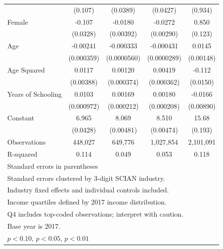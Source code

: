 \begin{table}[htbp]
\begin{tabular}{l*{4}{c}}
                    &     (0.107)         &    (0.0389)         &    (0.0427)         &     (0.934)         \\
\addlinespace
Female              &      -0.107\sym{***}&     -0.0180\sym{***}&     -0.0272\sym{***}&       0.850\sym{***}\\
                    &    (0.0328)         &   (0.00392)         &   (0.00290)         &     (0.123)         \\
\addlinespace
Age                 &    -0.00241\sym{***}&   -0.000333\sym{***}&   -0.000431\sym{***}&      0.0145\sym{***}\\
                    &  (0.000359)         & (0.0000560)         & (0.0000289)         &   (0.00148)         \\
\addlinespace
Age Squared         &      0.0117\sym{***}&     0.00120\sym{***}&     0.00419\sym{***}&      -0.112\sym{***}\\
                    &   (0.00388)         &  (0.000374)         &  (0.000362)         &    (0.0150)         \\
\addlinespace
Years of Schooling  &      0.0103\sym{***}&     0.00169\sym{***}&     0.00180\sym{***}&     -0.0166\sym{*}  \\
                    &  (0.000972)         &  (0.000212)         &  (0.000208)         &   (0.00890)         \\
\addlinespace
Constant            &       6.965\sym{***}&       8.069\sym{***}&       8.510\sym{***}&       15.68\sym{***}\\
                    &    (0.0428)         &   (0.00481)         &   (0.00474)         &     (0.193)         \\
\midrule
Observations        &     448,027         &     649,776         &   1,027,854         &   2,101,091         \\
R-squared           &       0.114         &       0.049         &       0.053         &       0.118         \\
\bottomrule
\multicolumn{5}{l}{\footnotesize Standard errors in parentheses}\\
\multicolumn{5}{l}{\footnotesize Standard errors clustered by 3-digit SCIAN industry.}\\
\multicolumn{5}{l}{\footnotesize Industry fixed effects and individual controls included.}\\
\multicolumn{5}{l}{\footnotesize Income quartiles defined by 2017 income distribution.}\\
\multicolumn{5}{l}{\footnotesize Q4 includes top-coded observations; interpret with caution.}\\
\multicolumn{5}{l}{\footnotesize Base year is 2017.}\\
\multicolumn{5}{l}{\footnotesize \sym{*} \(p<0.10\), \sym{**} \(p<0.05\), \sym{***} \(p<0.01\)}\\
\end{tabular}
\end{table}
